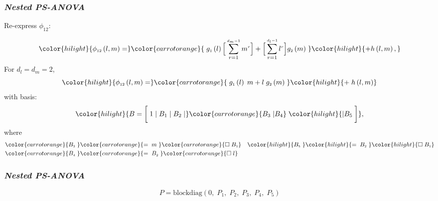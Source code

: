 \documentclass[12pt]{beamer}
\newcommand{\newmaththought}[1]{{ \color{hilight} {#1}}}
\newcommand{\carrotorangemath}[1]{{ \color{carrotorange} {#1}}}
\newcommand{\ms}{\scriptscriptstyle}
\begin{document}
\begin{frame}
\frametitle{\emph{Nested PS-ANOVA}}

Re-express $\phi_{\ms{12}}$:

\begin{align*}
\newmaththought{ \phi_{\ms{12}}\left(l,m\right)  =} \carrotorangemath{\; g_{\ms 1}\left(l\right) \Big[ \sum_{r=1}^{\ms{d_m-1}} m^{\ms r}\Big] + \Big[ \sum_{r=1}^{\ms{d_l-1}} l^{\ms r} \Big] g_{\ms 2}\left(m\right)\;}  \newmaththought{+ h\left( l,m \right), } 
\end{align*}
\noindent
For $d_l = d_m = 2$,
\[
\newmaththought{ \phi_{\ms{12}}\left(l,m\right)  =} \carrotorangemath{\; g_{\ms 1}\left(l\right) \; m+ l \; g_{\ms 2}\left(m\right)\;}\newmaththought{ + \; h\left( l,m \right) } 
\]
with basis:
\begin{equation} \label{eq:nested-SANOVA-basis-matrix}
\newmaththought{B = \bigg[  \; 1 \; \vert \;  B_1  \; \vert \; B_2 \; \vert} \carrotorangemath{ B_3 \; \vert B_4 }\;\newmaththought{ \vert B_5 \; \bigg]},
\end{equation}
\noindent
where
\begin{align*}
\carrotorangemath{B_{\ms 3}\;} &\carrotorangemath{= \;m \;} \carrotorangemath{ \square \;  B_{\ms 1}}  &  \newmaththought{B_{\ms 5}\;}\newmaththought{=\; B_{\ms 2} \;} \newmaththought{ \square \; B_{\ms 1} } \\
 \carrotorangemath{B_{\ms 4}\;}&\carrotorangemath{=\; B_{\ms 2} \;} \carrotorangemath{ \square \; l } &
\end{align*}
\noindent


\end{frame}




















\begin{frame}
\frametitle{\emph{Nested PS-ANOVA}}

\begin{equation*}
P = \mbox{blockdiag}\left(0,\;P_1,\;P_2,\;P_3,\;P_4,\;P_5\right)
\end{equation*}

\end{frame}
\end{document}
